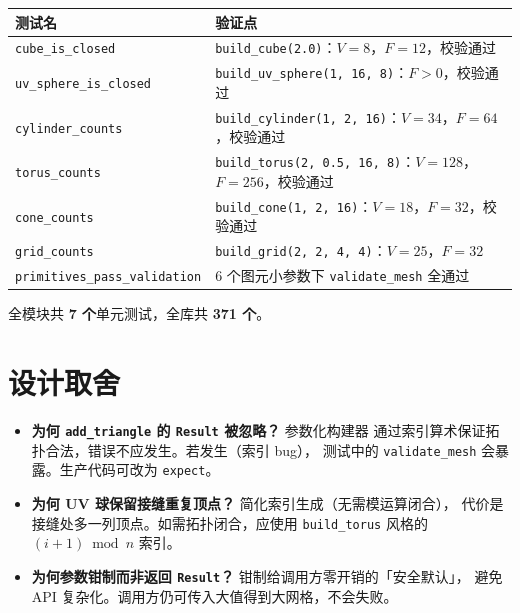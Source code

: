 \documentclass[11pt,a4paper]{article}
\begin{document}
\begin{center}
\renewcommand{\arraystretch}{1.18}
\begin{tabular}{@{}ll@{}}
  \toprule
  \textbf{测试名} & \textbf{验证点} \\
  \midrule
  \texttt{cube\_is\_closed}              & \texttt{build\_cube(2.0)}：$V=8$，$F=12$，校验通过 \\
  \texttt{uv\_sphere\_is\_closed}        & \texttt{build\_uv\_sphere(1, 16, 8)}：$F > 0$，校验通过 \\
  \texttt{cylinder\_counts}              & \texttt{build\_cylinder(1, 2, 16)}：$V=34$，$F=64$，校验通过 \\
  \texttt{torus\_counts}                 & \texttt{build\_torus(2, 0.5, 16, 8)}：$V=128$，$F=256$，校验通过 \\
  \texttt{cone\_counts}                  & \texttt{build\_cone(1, 2, 16)}：$V=18$，$F=32$，校验通过 \\
  \texttt{grid\_counts}                  & \texttt{build\_grid(2, 2, 4, 4)}：$V=25$，$F=32$ \\
  \texttt{primitives\_pass\_validation}  & 6 个图元小参数下 \texttt{validate\_mesh} 全通过 \\
  \bottomrule
\end{tabular}
\end{center}

全模块共 \textbf{7 个}单元测试，全库共 \textbf{371 个}。

\section{设计取舍}

\begin{itemize}
  \item \textbf{为何 \texttt{add\_triangle} 的 \texttt{Result} 被忽略？} 参数化构建器
        通过索引算术保证拓扑合法，错误不应发生。若发生（索引 bug），
        测试中的 \texttt{validate\_mesh} 会暴露。生产代码可改为 \texttt{expect}。
  \item \textbf{为何 UV 球保留接缝重复顶点？} 简化索引生成（无需模运算闭合），
        代价是接缝处多一列顶点。如需拓扑闭合，应使用 \texttt{build\_torus} 风格的
        $(i+1) \bmod n$ 索引。
  \item \textbf{为何参数钳制而非返回 \texttt{Result}？} 钳制给调用方零开销的「安全默认」，
        避免 API 复杂化。调用方仍可传入大值得到大网格，不会失败。
\end{itemize}
\end{document}
